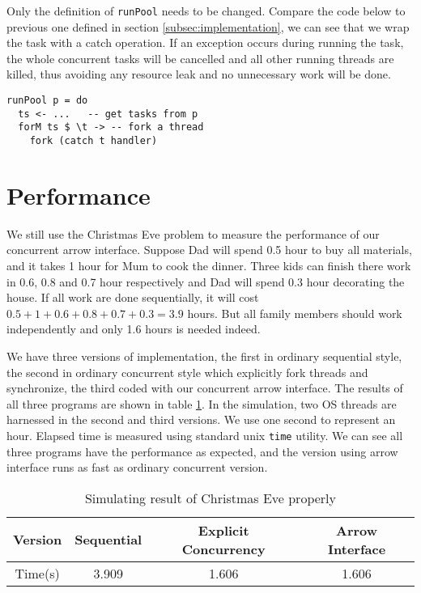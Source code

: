 \documentclass[conference]{IEEEtran}
\begin{document}
Only the definition of \texttt{runPool} needs to be changed. Compare the code below to previous
one defined in section \ref{subsec:implementation}, we can see that we wrap the task with a
catch operation. If an exception occurs during running the task, the whole concurrent tasks
will be cancelled and all other running threads are killed, thus avoiding any resource leak and
no unnecessary work will be done.
\begin{verbatim}
runPool p = do
  ts <- ...   -- get tasks from p
  forM ts $ \t -> -- fork a thread
    fork (catch t handler)
\end{verbatim}

\section{Performance}
We still use the Christmas Eve problem to measure the performance of our concurrent
arrow interface. Suppose Dad will spend 0.5 hour to buy all materials, and it takes
1 hour for Mum to cook the dinner. Three kids can finish there work in 0.6, 0.8 and 0.7 hour
respectively and Dad will spend 0.3 hour decorating the house. If all work are done
sequentially, it will cost $0.5+1+0.6+0.8+0.7+0.3=3.9$ hours. But all family members should
work independently and only 1.6 hours is needed indeed.

We have three versions of implementation, the first in ordinary sequential style,
the second in ordinary concurrent style which explicitly fork threads and synchronize,
the third coded with our concurrent arrow interface.
The results of all three programs are shown in table \ref{tab:simulating-result}.
In the simulation, two OS threads are harnessed in the second and third versions.
We use one second to represent an hour. Elapsed time is measured using standard unix
\texttt{time} utility. We can see all three programs have the performance as
expected, and the version using arrow interface runs as fast as ordinary concurrent
version.
\begin{table}
\caption{Simulating result of Christmas Eve properly}
\label{tab:simulating-result}
\centering
\begin{tabular}{|c||c||c||c|}
\hline
Version & Sequential & Explicit Concurrency & Arrow Interface\\
\hline
Time(s) & 3.909 & 1.606 & 1.606\\
\hline
\end{tabular}
\end{table}
\end{document}
